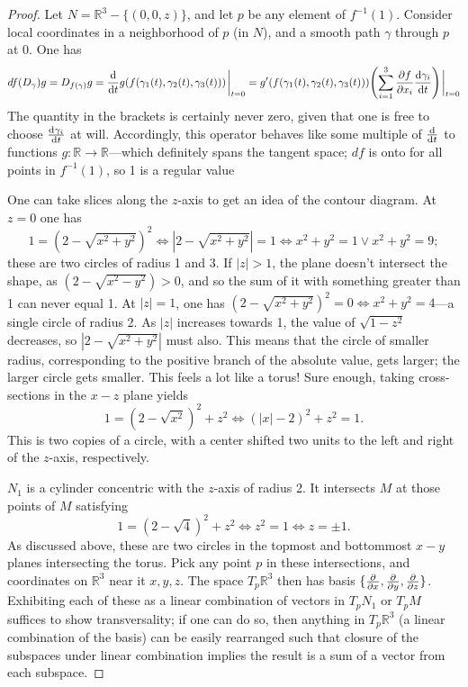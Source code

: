 \documentclass{article}
\begin{document}
\begin{proof}
  Let $N = \mathbb{R}^{3} - \{(0, 0, z)\}$, and let $p$ be any element of $f^{-1}(1)$.
  Consider local coordinates in a neighborhood of $p$ (in $N$), and a smooth path $\gamma$ through $p$ at 0.
  One has
  \[
    df(D_{\gamma})g = D_{f(\gamma)}g = \dv{t}g(f(\gamma_{1}(t), \gamma_{2}(t), \gamma_{3}(t)))\eval_{t = 0}
    = g'(f(\gamma_{1}(t), \gamma_{2}(t), \gamma_{3}(t)))\qty(\sum_{i = 1}^{3} \pdv{f}{x_{i}}\dv{\gamma_{i}}{t})\eval_{t = 0}
  \]
  The quantity in the brackets is certainly never zero, given that one is free to choose $\dv{\gamma_{i}}{t}$ at will.
  Accordingly, this operator behaves like some multiple of $\dv{t}$ to functions $g: \mathbb{R} \to \mathbb{R}$---which
  definitely spans the tangent space; $df$ is onto for all points in $f^{-1}(1)$, so 1 is a regular value

  One can take slices along the $z$-axis to get an idea of the contour diagram.
  At $z = 0$ one has
  \[
    1 = (2 - \sqrt{x^{2} + y^{2}})^{2} \Leftrightarrow |2 - \sqrt{x^{2} + y^{2}}| = 1
    \Leftrightarrow x^{2} + y^{2} = 1 \lor x^{2} + y^{2} = 9;
  \]
  these are two circles of radius 1 and 3.
  If $|z| > 1$, the plane doesn't intersect the shape, as $(2 - \sqrt{x^{2} - y^{2}}) > 0$,
  and so the sum of it with something greater than 1 can never equal 1.
  At $|z| = 1$, one has $(2 - \sqrt{x^{2} + y^{2}})^{2} = 0 \Leftrightarrow x^{2} + y^{2} = 4$---a single circle of radius 2.
  As $|z|$ increases towards 1, the value of $\sqrt{1 - z^{2}}$ decreases, so $|2 - \sqrt{x^{2} + y^{2}}|$ must also.
  This means that the circle of smaller radius, corresponding to the positive branch of the absolute value,
  gets larger; the larger circle gets smaller.
  This feels a lot like a torus!
  Sure enough, taking cross-sections in the $x-z$ plane yields
  \[
    1 = (2 - \sqrt{x^{2}})^{2} + z^{2} \Leftrightarrow (|x| - 2)^{2} + z^{2} = 1.
  \]
  This is two copies of a circle, with a center shifted two units to the left and right of the $z$-axis, respectively.

  $N_{1}$ is a cylinder concentric with the $z$-axis of radius 2.
  It intersects $M$ at those points of $M$ satisfying
  \[
    1 = (2 - \sqrt{4})^{2} + z^{2} \Leftrightarrow z^{2} = 1 \Leftrightarrow z = \pm 1.
  \]
  As discussed above, these are two circles in the topmost and bottommost $x-y$ planes intersecting the torus.
  Pick any point $p$ in these intersections, and coordinates on $\mathbb{R}^{3}$ near it $x, y, z$.
  The space $T_{p}\mathbb{R}^{3}$ then has basis $\{\pdv{x}, \pdv{y}, \pdv{z}\}$.
  Exhibiting each of these as a linear combination of vectors in $T_{p}N_{1}$ or $T_{p}M$ suffices to show transversality;
  if one can do so, then anything in $T_{p}\mathbb{R}^{3}$ (a linear combination of the basis)
  can be easily rearranged such that closure of the subspaces under linear combination implies the result
  is a sum of a vector from each subspace.


\end{proof}
\end{document}
